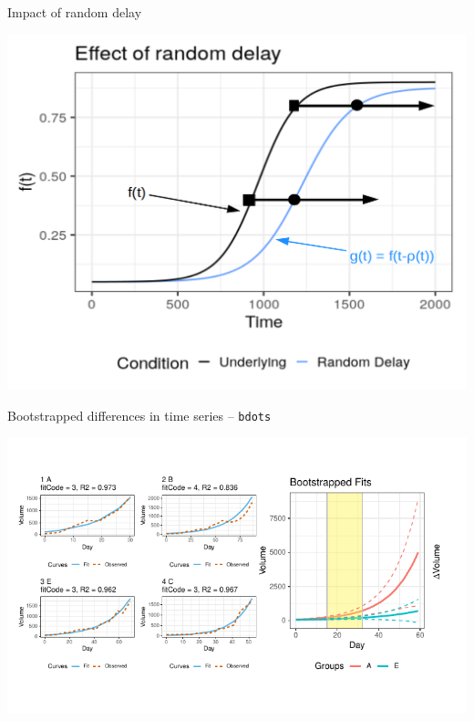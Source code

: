 \documentclass{beamer}
\begin{document}
%
%
%
%
\begin{frame}{Impact of random delay}
\begin{center}
\includegraphics[scale=0.35]{img/full_delay_plot.png}
\end{center}
\end{frame}


\begin{frame}{Bootstrapped differences in time series -- \texttt{bdots}}
\vspace{-1mm}
\begin{center}
\includegraphics{bdots_examples.pdf}
\end{center}
\end{frame}
\end{document}
